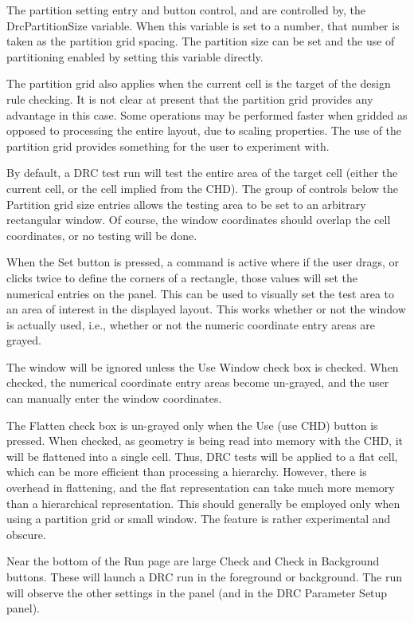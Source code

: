 The partition setting entry and button control, and are controlled by,
the {\et DrcPartitionSize} variable.  When this variable is set to a
number, that number is taken as the partition grid spacing.  The
partition size can be set and the use of partitioning enabled by
setting this variable directly.

The partition grid also applies when the current cell is the target of
the design rule checking.  It is not clear at present that the
partition grid provides any advantage in this case.  Some operations
may be performed faster when gridded as opposed to processing the
entire layout, due to scaling properties.  The use of the partition
grid provides something for the user to experiment with.

By default, a DRC test run will test the entire area of the target
cell (either the current cell, or the cell implied from the CHD).  The
group of controls below the {\cb Partition grid size} entries allows
the testing area to be set to an arbitrary rectangular window.  Of
course, the window coordinates should overlap the cell coordinates, or
no testing will be done.

When the {\cb Set} button is pressed, a command is active where if the
user drags, or clicks twice to define the corners of a rectangle,
those values will set the numerical entries on the panel.  This can be
used to visually set the test area to an area of interest in the
displayed layout.  This works whether or not the window is actually
used, i.e., whether or not the numeric coordinate entry areas are
grayed.

The window will be ignored unless the {\cb Use Window} check box is
checked.  When checked, the numerical coordinate entry areas become
un-grayed, and the user can manually enter the window coordinates.

The {\cb Flatten} check box is un-grayed only when the {\cb Use} (use
CHD) button is pressed.  When checked, as geometry is being read into
memory with the CHD, it will be flattened into a single cell.  Thus,
DRC tests will be applied to a flat cell, which can be more efficient
than processing a hierarchy.  However, there is overhead in
flattening, and the flat representation can take much more memory than
a hierarchical representation.  This should generally be employed only
when using a partition grid or small window.  The feature is rather
experimental and obscure.

Near the bottom of the {\cb Run} page are large {\cb Check} and {\cb
Check in Background} buttons.  These will launch a DRC run in the
foreground or background.  The run will observe the other settings in
the panel (and in the {\cb DRC Parameter Setup} panel).

